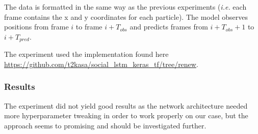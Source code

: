 \documentclass[a4paper]{article}
\begin{document}
  The data is formatted in the same way as the previous experiments (\textit{i.e.} each frame contains the x and y coordinates for each particle). The model observes positions from frame $i$ to frame $i+T_{obs}$ and predicts frames from $i+T_{obs}+1$ to $i+T_{pred}$.

  The experiment used the implementation found here \url{https://github.com/t2kasa/social_lstm_keras_tf/tree/renew}.

  \subsubsection{Results}
  The experiment did not yield good results as the network architecture needed more hyperparameter tweaking in order to work properly on our case, but the approach seems to promising and should be investigated further.  
\end{document}
